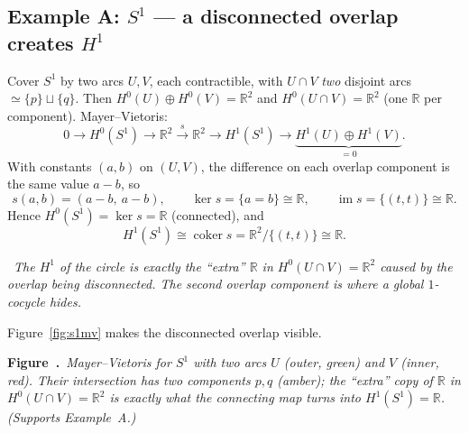 \documentclass[11pt]{article}
\newcommand{\RR}{\mathbb R}
\newcommand{\im}{\operatorname{im}}
\newcommand{\coker}{\operatorname{coker}}
\newcommand{\kerop}{\operatorname{ker}}
\newcommand{\diagnose}[1]{%
  \par\smallskip\noindent{\color{accent}\textbf{Diagnosis.}}\ \emph{#1}\par\smallskip}
\newcounter{figcnt}
\newcommand{\figcap}[2]{\refstepcounter{figcnt}\label{#1}\par\smallskip
  {\centering\footnotesize\textbf{Figure~\thefigcnt.}\ \textit{#2}\par}\smallskip}
\theoremstyle{plain}
\theoremstyle{definition}
\begin{document}
\subsection*{Example A: \(S^1\) --- a disconnected overlap creates \(H^1\)}
Cover $S^1$ by two arcs $U,V$, each contractible, with $U\cap V$ \emph{two}
disjoint arcs $\simeq\{p\}\sqcup\{q\}$. Then $H^0(U)\oplus H^0(V)=\RR^2$ and
$H^0(U\cap V)=\RR^2$ (one $\RR$ per component). Mayer--Vietoris:
\[
  0\to H^0(S^1)\to \RR^2\xrightarrow{\,s\,}\RR^2\to H^1(S^1)\to
  \underbrace{H^1(U)\oplus H^1(V)}_{=0}.
\]
With constants $(a,b)$ on $(U,V)$, the difference on each overlap component is the
same value $a-b$, so
\[
  s(a,b)=(a-b,\ a-b),\qquad \kerop s=\{a=b\}\cong\RR,\qquad \im s=\{(t,t)\}\cong\RR .
\]
Hence $H^0(S^1)=\kerop s=\RR$ (connected), and
\[
  H^1(S^1)\cong\coker s=\RR^2/\{(t,t)\}\cong\RR .
\]
\diagnose{The $H^1$ of the circle is exactly the ``extra'' $\RR$ in
$H^0(U\cap V)=\RR^2$ caused by the overlap being \emph{disconnected}. The second
overlap component is where a global $1$-cocycle hides.}

\noindent Figure~\ref{fig:s1mv} makes the disconnected overlap visible.

\begin{center}
\figcap{fig:s1mv}{Mayer--Vietoris for $S^1$ with two arcs $U$ (outer, green) and
$V$ (inner, red). Their intersection has \emph{two} components $p,q$ (amber); the
``extra'' copy of $\RR$ in $H^0(U\cap V)=\RR^2$ is exactly what the connecting
map turns into $H^1(S^1)=\RR$. (Supports Example~A.)}
\end{center}
\end{document}

